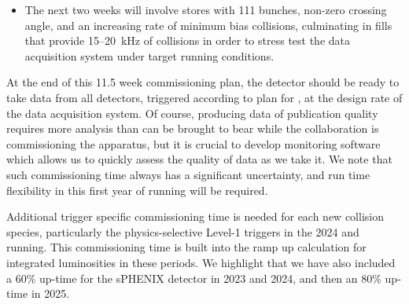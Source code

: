 \begin{itemize}
\item The next two weeks will involve stores with 111 bunches,
  non-zero crossing angle, and an increasing rate of minimum bias
  collisions, culminating in fills that provide 15--20~kHz of
  collisions in order to stress test the data acquisition system under
  target running conditions.

\end{itemize}

At the end of this 11.5 week commissioning plan, the detector should be
ready to take data from all detectors, triggered according to plan for
\auau, at the design rate of the data acquisition system.  Of course,
producing data of publication quality requires more analysis than can
be brought to bear while the collaboration is commissioning the
apparatus, but it is crucial to develop monitoring software which
allows us to quickly assess the quality of data as we take it.  We
note that such commissioning time always has a significant uncertainty,
and run time flexibility in this first year of running will be
required.

Additional trigger specific commissioning time is needed for each new
collision species, particularly the physics-selective Level-1 triggers
in the 2024 \pp and \pau running.  This commissioning time is built
into the ramp up calculation for integrated luminosities in these
periods.  We highlight that we have also included a 60\% up-time for
the sPHENIX detector in 2023 and 2024, and then an 80\% up-time in
2025.
